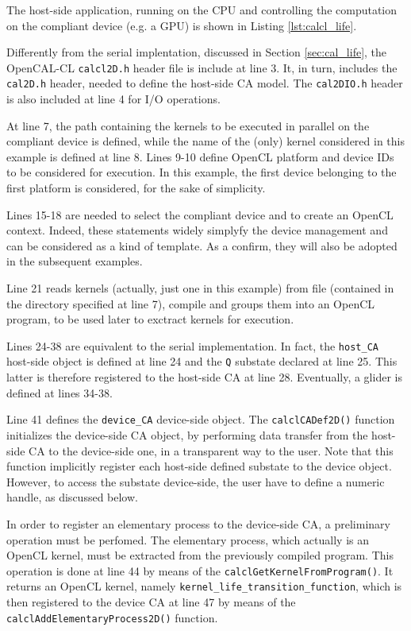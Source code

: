 The host-side application, running on the CPU and controlling the
computation on the compliant device (e.g. a GPU) is shown in Listing
\ref{lst:calcl_life}.

Differently from the serial implentation, discussed in Section
\ref{sec:cal_life}, the OpenCAL-CL \verb'calcl2D.h' header file is
include at line 3. It, in turn, includes the \verb'cal2D.h' header,
needed to define the host-side CA model. The \verb'cal2DIO.h' header
is also included at line 4 for I/O operations.

At line 7, the path containing the kernels to be executed in parallel
on the compliant device is defined, while the name of the (only)
kernel considered in this example is defined at line 8. Lines 9-10
define OpenCL platform and device IDs to be considered for
execution. In this example, the first device belonging to the first
platform is considered, for the sake of simplicity.

Lines 15-18 are needed to select the compliant device and to create an
OpenCL context. Indeed, these statements widely simplyfy the device
management and can be considered as a kind of template. As a confirm,
they will also be adopted in the subsequent examples.

Line 21 reads kernels (actually, just one in this example) from file
(contained in the directory specified at line 7), compile and groups
them into an OpenCL program, to be used later to exctract kernels for
execution.

Lines 24-38 are equivalent to the serial implementation. In fact, the
\verb'host_CA' host-side object is defined at line 24 and the \verb'Q'
substate declared at line 25. This latter is therefore registered to
the host-side CA at line 28. Eventually, a glider is defined at lines
34-38.

Line 41 defines the \verb'device_CA' device-side object. The
\verb'calclCADef2D()' function initializes the device-side CA object,
by performing data transfer from the host-side CA to the device-side
one, in a transparent way to the user. Note that this function
implicitly register each host-side defined substate to the device
object. However, to access the substate device-side, the user have to
define a numeric handle, as discussed below.

In order to register an elementary process to the device-side CA, a
preliminary operation must be perfomed. The elementary process, which
actually is an OpenCL kernel, must be extracted from the previously
compiled program. This operation is done at line 44 by means of the
\verb'calclGetKernelFromProgram()'. It returns an OpenCL kernel,
namely \verb'kernel_life_transition_function', which is then
registered to the device CA at line 47 by means of the
\verb'calclAddElementaryProcess2D()' function.

